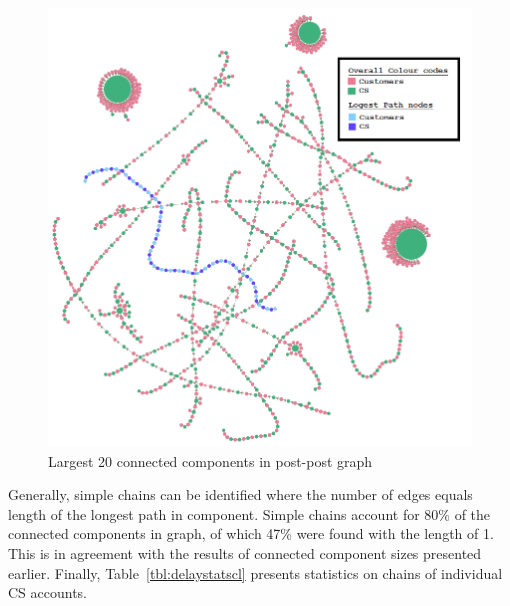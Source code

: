 \documentclass[sigconf]{acmart}
\begin{document}
\begin{figure}[htb]
\centering
\includegraphics[width=\columnwidth]{images/20ccpostpostgraph.png}
\caption{Largest 20 connected components in post-post graph}
\label{fig:20ccpostpostgraph}
\end{figure}

Generally, simple chains can be identified where the number of edges
equals length of the longest path in component. Simple chains account
for 80\% of the connected components in graph, of which 47\% were
found with the length of 1. This is in agreement with the results of
connected component sizes presented earlier. Finally,
Table~\ref{tbl:delaystatscl} presents statistics on chains of
individual CS accounts.

\end{document}
